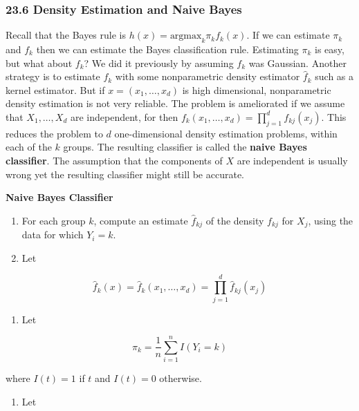 \subsubsection{23.6 Density Estimation and Naive Bayes}\label{density-estimation-and-naive-bayes}

Recall that the Bayes rule is \(h(x) = \text{argmax}_k \pi_k f_k(x)\).
If we can estimate \(\pi_k\) and \(f_k\) then we can estimate the Bayes
classification rule. Estimating \(\pi_k\) is easy, but what about
\(f_k\)? We did it previously by assuming \(f_k\) was Gaussian. Another
strategy is to estimate \(f_k\) with some nonparametric density
estimator \(\hat{f}_k\) such as a kernel estimator. But if
\(x = (x_1, \dots, x_d)\) is high dimensional, nonparametric density
estimation is not very reliable. The problem is ameliorated if we assume
that \(X_1, \dots, X_d\) are independent, for then
\(f_k(x_1, \dots, x_d) = \prod_{j=1}^d f_{kj}(x_j)\). This reduces the
problem to \(d\) one-dimensional density estimation problems, within
each of the \(k\) groups. The resulting classifier is called the
\textbf{naive Bayes classifier}. The assumption that the components of
\(X\) are independent is usually wrong yet the resulting classifier
might still be accurate.

\textbf{Naive Bayes Classifier}

\begin{enumerate}
\def\labelenumi{\arabic{enumi}.}
\item
  For each group \(k\), compute an estimate \(\hat{f}_{kj}\) of the
  density \(f_{kj}\) for \(X_j\), using the data for which \(Y_i = k\).
\item
  Let
\end{enumerate}

\[ \hat{f}_k(x) = \hat{f}_k(x_1, \dots, x_d) = \prod_{j=1}^d \hat{f}_{kj}(x_j) \]

\begin{enumerate}[tightlist,label={\arabic*.},resume]
\item
  Let
\end{enumerate}

\[ \hat{\pi}_k = \frac{1}{n} \sum_{i=1}^n I(Y_i = k) \]

where \(I(t) = 1\) if \(t\) and \(I(t) = 0\) otherwise.

\begin{enumerate}[tightlist,label={\arabic*.},resume]
\item
  Let
\end{enumerate}

